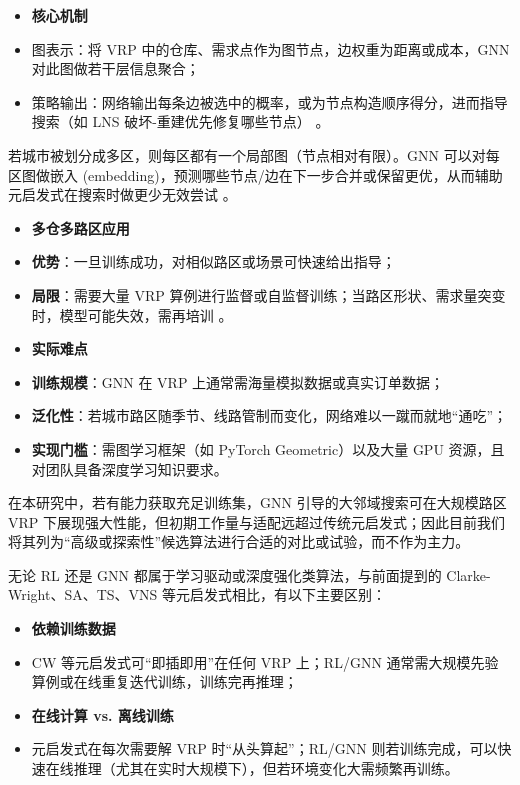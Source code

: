 \documentclass[12pt,a4paper,twoside]{ctexbook}
\begin{document}
    \begin{itemize}
        \item \textbf{核心机制}
        \item 图表示：将 VRP 中的仓库、需求点作为图节点，边权重为距离或成本，GNN 对此图做若干层信息聚合；
        \item 策略输出：网络输出每条边被选中的概率，或为节点构造顺序得分，进而指导搜索（如 LNS 破坏-重建优先修复哪些节点） \cite{gnn_search}。
    \end{itemize}

    若城市被划分成多区，则每区都有一个局部图（节点相对有限）。GNN 可以对每区图做嵌入 (embedding)，预测哪些节点/边在下一步合并或保留更优，从而辅助元启发式在搜索时做更少无效尝试 \cite{gnn_application}。
    \begin{itemize}
        \item \textbf{多仓多路区应用}
        \item \textbf{优势}：一旦训练成功，对相似路区或场景可快速给出指导；
        \item \textbf{局限}：需要大量 VRP 算例进行监督或自监督训练；当路区形状、需求量突变时，模型可能失效，需再培训 \cite{gnn_limitation}。
    \end{itemize}

    \begin{itemize}
        \item \textbf{实际难点}
        \item \textbf{训练规模}：GNN 在 VRP 上通常需海量模拟数据或真实订单数据；
        \item \textbf{泛化性}：若城市路区随季节、线路管制而变化，网络难以一蹴而就地“通吃”；
        \item \textbf{实现门槛}：需图学习框架（如 PyTorch Geometric）以及大量 GPU 资源，且对团队具备深度学习知识要求。
    \end{itemize}
    在本研究中，若有能力获取充足训练集，GNN 引导的大邻域搜索可在大规模路区 VRP 下展现强大性能，但初期工作量与适配远超过传统元启发式；因此目前我们将其列为“高级或探索性”候选算法进行合适的对比或试验，而不作为主力。

无论 RL 还是 GNN 都属于学习驱动或深度强化类算法，与前面提到的 Clarke-Wright、SA、TS、VNS 等元启发式相比，有以下主要区别：

    \begin{itemize}
        \item \textbf{依赖训练数据}
        \item CW 等元启发式可“即插即用”在任何 VRP 上；RL/GNN 通常需大规模先验算例或在线重复迭代训练，训练完再推理；
    \end{itemize}
    \begin{itemize}
    \item \textbf{在线计算 vs. 离线训练}

        \item 元启发式在每次需要解 VRP 时“从头算起”；RL/GNN 则若训练完成，可以快速在线推理（尤其在实时大规模下），但若环境变化大需频繁再训练。
    \end{itemize}
\end{document}
